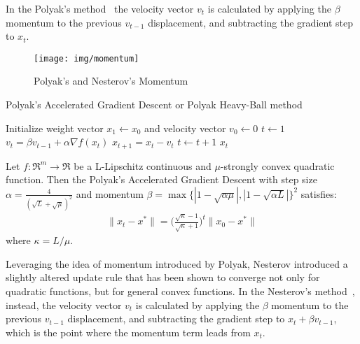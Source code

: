 In the Polyak's method~\cite{polyak1964some} the velocity vector $v_t$ is calculated by applying the $\beta$ momentum to the previous $v_{t-1}$ displacement, and subtracting the gradient step to $x_t$.


\begin{figure}[h!]
	\centering
  	\texttt{[image: img/momentum]}
  	\caption{Polyak's and Nesterov's Momentum}
  	\label{fig:momentum}
\end{figure}

\begin{algorithm}[H]
	\caption{Polyak's Accelerated Gradient Descent or Polyak Heavy-Ball method}
	\label{alg:pag}
	\begin{algorithmic}
		\Require{Momentum $\beta \in [0,1)$}
			\State Initialize weight vector $x_1 \gets x_0$ and velocity vector $v_0 \gets 0$
			\State $t \gets 1$
				\State $v_t = \beta v_{t-1} + \alpha \nabla f(x_t)$
				\State $x_{t+1} = x_t - v_t$
				\State $t \gets t + 1$
			\EndWhile
			\State \Return $x_t$
		\EndFunction
	\end{algorithmic}
\end{algorithm}


\begin{theorem}[\href{https://angms.science/doc/CVX/CVX_HBM.pdf\#page=21}{Polyak's Accelerated Gradient Descent convergence for convex quadratic functions}] \label{thm:quad_pag_convergence}
Let $f: \Re^m \rightarrow \Re$ be a L-Lipschitz continuous and $\mu$-strongly convex quadratic function. Then the Polyak's Accelerated Gradient Descent with step size $\alpha = \displaystyle \frac{4}{(\sqrt{L} + \sqrt{\mu})^2}$ and momentum $\beta = \max{\{|1 - \sqrt{\alpha \mu}|, |1 - \sqrt{\alpha L}|\}^2}$ satisfies:
$$
\begin{aligned}
	\| x_t - x^* \| = \bigg(\frac{\sqrt{\kappa}-1}{\sqrt{\kappa}+1}\bigg)^t \| x_0 - x^* \|
\end{aligned}
$$
where $\kappa = L/\mu$.
\end{theorem}

Leveraging the idea of momentum introduced by Polyak, Nesterov introduced a slightly altered update rule that has been shown to converge not only for quadratic functions, but for general convex functions. In the Nesterov's method~\cite{nesterov1998introductory}, instead, the velocity vector $v_t$ is calculated by applying the $\beta$ momentum to the previous $v_{t-1}$ displacement, and subtracting the gradient step to $x_t + \beta v_{t-1}$, which is the point where the momentum term leads from $x_t$.

